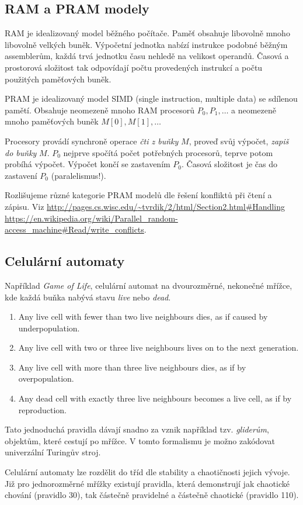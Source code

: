 \subsection{RAM a PRAM modely}


RAM je idealizovaný model běžného počítače. Paměť obsahuje libovolně
mnoho libovolně velkých buněk. Výpočetní jednotka nabízí
instrukce podobné běžným assemblerům, každá trvá jednotku času nehledě
na velikost operandů. Časová a prostorová složitost tak odpovídají počtu
provedených instrukcí a počtu použitých paměťových buněk.

PRAM je idealizovaný model SIMD (single instruction, multiple data) se
sdílenou pamětí. Obsahuje
neomezeně mnoho RAM procesorů $P_0, P_1,\ldots$
a neomezeně mnoho paměťových buněk $M[0], M[1],\ldots$

Procesory provádí synchroně operace {\em čti z buňky} $M$, proveď svůj
výpočet, {\em zapiš do buňky} $M$.
$P_0$ nejprve spočítá počet potřebných procesorů, teprve potom probíhá
výpočet. Výpočet končí se zastavením $P_0$. Časová složitost je čas
do zastavení $P_0$ (paralelismus!).

Rozlišujeme různé kategorie PRAM modelů dle řešení konfliktů při čtení a
zápisu. Viz
\href{http://pages.cs.wisc.edu/~tvrdik/2/html/Section2.html#Handling}{http://pages.cs.wisc.edu/{\textasciitilde}tvrdik/2/html/Section2.html\#Handling}\\
\href{https://en.wikipedia.org/wiki/Parallel_random-access_machine#Read/write_conflicts}{https://en.wikipedia.org/wiki/Parallel\_random-access\_machine\#Read/write\_conflicts}.

\subsection{Celulární automaty}

Například {\em Game of Life}, celulární automat na dvourozměrné, nekonečné
mřížce, kde každá buňka nabývá stavu {\em live} nebo {\em dead}.

\begin{enumerate}
    \item Any live cell with fewer than two live neighbours dies, as if caused by underpopulation.
    \item Any live cell with two or three live neighbours lives on to the next generation.
    \item Any live cell with more than three live neighbours dies, as if by overpopulation.
    \item Any dead cell with exactly three live neighbours becomes a live cell, as if by reproduction.
\end{enumerate}

Tato jednoduchá pravidla dávají snadno za vznik například tzv. {\em
gliderům}, objektům, které cestují po mřížce.
V tomto formalismu je možno zakódovat univerzální Turingův stroj.

Celulární automaty lze rozdělit do tříd dle stability a
chaotičnosti jejich vývoje. Již pro jednorozměrné
mřížky existují pravidla, která demonstrují jak chaotické chování
(pravidlo 30), tak částečně pravidelné a částečně chaotické (pravidlo
110).
